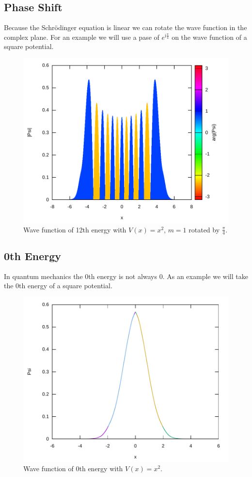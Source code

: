 \documentclass[11pt,DIV=10,final]{scrreprt} %
\newcommand{\mi}{{\text{i}}}
\begin{document}
{\subsection{Phase Shift}
Because the Schrödinger equation is linear we can rotate the wave function in the complex plane. For an example we will use a pase of $e^{\mi \frac{\pi}{4}}$ on the wave function of a square potential.
\begin{figure}[H]
  \centering
  \includegraphics[width=\textwidth]{plots/square-12-pi4.pdf}
  \caption{Wave function of 12th energy with $V(x) = x^{2}$, $m = 1$ rotated by $\frac{\pi}{4}$.}
\end{figure}

\subsection{0th Energy}
\begin{minipage}{\textwidth}
In quantum mechanics the 0th energy is not always 0. As an example we will take the 0th
energy of a square potential.
\begin{figure}[H]
  \centering
  \includegraphics[width=\textwidth]{plots/square-0.pdf}
  \caption{Wave function of 0th energy with $V(x) = x^{2}$.}
\end{figure}
\end{minipage}

}
\end{document}
